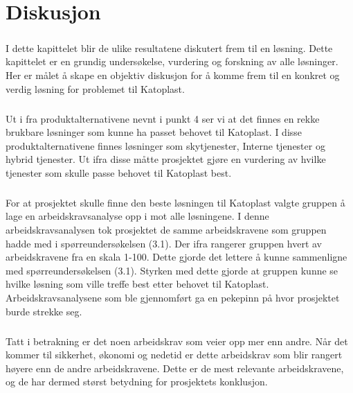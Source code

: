 \chapter{Diskusjon}

\paragraph{}I dette kapittelet blir de ulike resultatene diskutert frem til en løsning. Dette kapittelet er en grundig undersøkelse, vurdering og forskning av alle løsninger. Her er målet å skape en objektiv diskusjon for å komme frem til en konkret og verdig løsning for problemet til Katoplast. 

\paragraph{}Ut i fra produktalternativene nevnt i punkt 4 ser vi at det finnes en rekke brukbare løsninger som kunne ha passet behovet til Katoplast. I disse produktalternativene finnes løsninger som skytjenester, Interne tjenester og hybrid tjenester. Ut ifra disse måtte prosjektet gjøre en vurdering av hvilke tjenester som skulle passe behovet til Katoplast best. 

\paragraph{} For at prosjektet skulle finne den beste løsningen til Katoplast valgte gruppen å lage en arbeidskravsanalyse opp i mot alle løsningene. I denne arbeidskravsanalysen tok prosjektet de samme arbeidskravene som gruppen hadde med i spørreundersøkelsen (3.1). Der ifra rangerer gruppen hvert av arbeidskravene fra en skala 1-100. Dette gjorde det lettere å kunne sammenligne med spørreundersøkelsen (3.1). Styrken med dette gjorde at gruppen kunne se hvilke løsning som ville treffe best etter behovet til Katoplast. Arbeidskravsanalysene som ble gjennomført ga en pekepinn på hvor prosjektet burde strekke seg.


\paragraph{} Tatt i betrakning er det noen arbeidskrav som veier opp mer enn andre. Når det kommer til sikkerhet, økonomi og nedetid er dette arbeidskrav som blir rangert høyere enn de andre arbeidskravene. Dette er de mest relevante arbeidskravene, og de har dermed størst betydning for prosjektets konklusjon.

